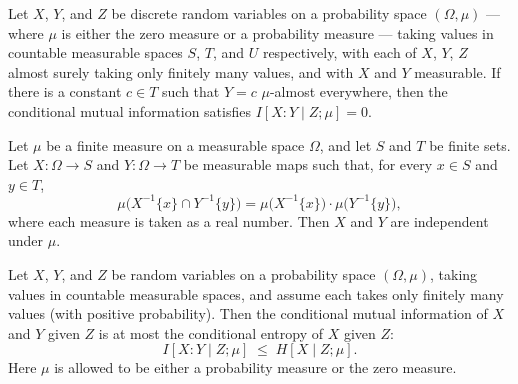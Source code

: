 \begin{theorem}
\label{ProbabilityTheory.condMutualInfo_eq_zero_of_ae_eq_const_right}
\leanok
{}
Let $X$, $Y$, and $Z$ be discrete random variables on a probability space $(\Omega,
\mu)$ — where $\mu$ is either the zero measure or a probability measure — taking values
in countable measurable spaces $S$, $T$, and $U$ respectively, with each of $X$, $Y$,
$Z$ almost surely taking only finitely many values, and with $X$ and $Y$ measurable. If
there is a constant $c \in T$ such that $Y = c$ $\mu$-almost everywhere, then the
conditional mutual information satisfies $I[X : Y \mid Z; \mu] = 0$.
\end{theorem}

\begin{theorem}
\label{ProbabilityTheory.indepFun_of_measureReal_inter_preimage_singleton_eq_mul}
\leanok
{}
Let $\mu$ be a finite measure on a measurable space $\Omega$, and let $S$ and $T$ be
finite sets. Let $X : \Omega \to S$ and $Y : \Omega \to T$ be measurable maps such that,
for every $x \in S$ and $y \in T$,
\[
\mu\bigl(X^{-1}\{x\} \cap Y^{-1}\{y\}\bigr) = \mu\bigl(X^{-1}\{x\}\bigr)\cdot
\mu\bigl(Y^{-1}\{y\}\bigr),
\]
where each measure is taken as a real number. Then $X$ and $Y$ are independent under
$\mu$.
\end{theorem}

\begin{theorem}
\label{ProbabilityTheory.condMutualInfo_le_condEntropy_left}
\leanok
{}
Let $X$, $Y$, and $Z$ be random variables on a probability space $(\Omega, \mu)$, taking
values in countable measurable spaces, and assume each takes only finitely many values
(with positive probability). Then the conditional mutual information of $X$ and $Y$
given $Z$ is at most the conditional entropy of $X$ given $Z$:
\[
  I[X : Y \mid Z ; \mu] \;\le\; H[X \mid Z ; \mu].
\]
Here $\mu$ is allowed to be either a probability measure or the zero measure.
\end{theorem}

